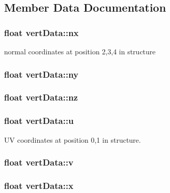 \subsection{Member Data Documentation}
\hypertarget{structvert_data_a07ad8d8942e0d1bc0e7da9fedf6d7743}{
\subsubsection[{nx}]{\setlength{\rightskip}{0pt plus 5cm}float vert\-Data\-::nx}}\label{structvert_data_a07ad8d8942e0d1bc0e7da9fedf6d7743}


normal coordinates at position 2,3,4 in structure 

\hypertarget{structvert_data_a3ef24b3c72da692c44ecfd4a35311e3b}{
\subsubsection[{ny}]{\setlength{\rightskip}{0pt plus 5cm}float vert\-Data\-::ny}}\label{structvert_data_a3ef24b3c72da692c44ecfd4a35311e3b}
\hypertarget{structvert_data_a05857ec55116d094517557a8ea4a64b1}{
\subsubsection[{nz}]{\setlength{\rightskip}{0pt plus 5cm}float vert\-Data\-::nz}}\label{structvert_data_a05857ec55116d094517557a8ea4a64b1}
\hypertarget{structvert_data_a2105cbd897b53fc784a8a18b2666176e}{
\subsubsection[{u}]{\setlength{\rightskip}{0pt plus 5cm}float vert\-Data\-::u}}\label{structvert_data_a2105cbd897b53fc784a8a18b2666176e}


U\-V coordinates at position 0,1 in structure. 

\hypertarget{structvert_data_a7db60ebd2dc77380d7ca9a95758a1610}{
\subsubsection[{v}]{\setlength{\rightskip}{0pt plus 5cm}float vert\-Data\-::v}}\label{structvert_data_a7db60ebd2dc77380d7ca9a95758a1610}
\hypertarget{structvert_data_ac5543195adeb4d007bc053b7a58cf9f6}{
\subsubsection[{x}]{\setlength{\rightskip}{0pt plus 5cm}float vert\-Data\-::x}}\label{structvert_data_ac5543195adeb4d007bc053b7a58cf9f6}



